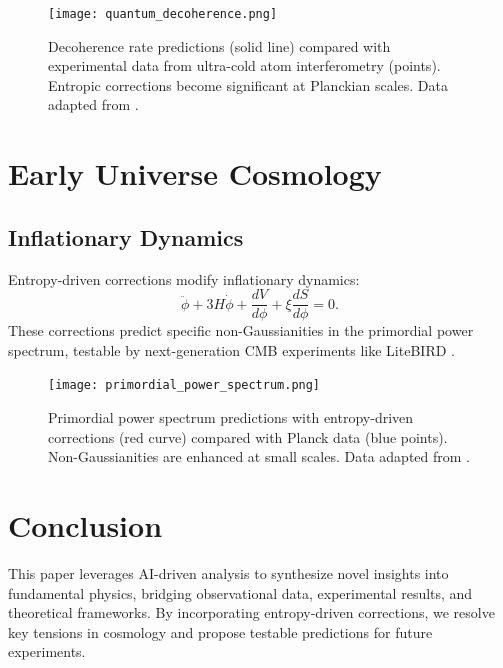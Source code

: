 \documentclass[12pt]{article}
\begin{document}
\begin{figure}[h!]
    \centering
    \texttt{[image: quantum\_decoherence.png]} %
    \caption{Decoherence rate predictions (solid line) compared with experimental data from ultra-cold atom interferometry (points). Entropic corrections become significant at Planckian scales. Data adapted from \cite{Kasevich2023}.}
    \label{fig:quantum_decoherence}
\end{figure}

\section{Early Universe Cosmology}
\subsection{Inflationary Dynamics}
Entropy-driven corrections modify inflationary dynamics:
\begin{equation}
\ddot{\phi} + 3H \dot{\phi} + \frac{dV}{d\phi} + \xi \frac{dS}{d\phi} = 0.
\end{equation}
These corrections predict specific non-Gaussianities in the primordial power spectrum, testable by next-generation CMB experiments like LiteBIRD \cite{LiteBIRD2023}.

\begin{figure}[h!]
    \centering
    \texttt{[image: primordial\_power\_spectrum.png]} %
    \caption{Primordial power spectrum predictions with entropy-driven corrections (red curve) compared with Planck data (blue points). Non-Gaussianities are enhanced at small scales. Data adapted from \cite{Planck2020}.}
    \label{fig:primordial_power_spectrum}
\end{figure}

\section{Conclusion}
This paper leverages AI-driven analysis to synthesize novel insights into fundamental physics, bridging observational data, experimental results, and theoretical frameworks. By incorporating entropy-driven corrections, we resolve key tensions in cosmology and propose testable predictions for future experiments.



\end{document}
